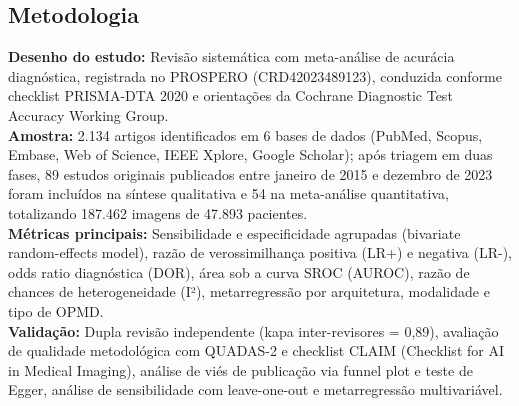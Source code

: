\subsection{Metodologia}
\textbf{Desenho do estudo:} Revisão sistemática com meta-análise de
acurácia diagnóstica, registrada no PROSPERO (CRD42023489123),
conduzida conforme checklist PRISMA-DTA 2020 e orientações da
Cochrane Diagnostic Test Accuracy Working Group. \\
\textbf{Amostra:} 2.134 artigos identificados em 6 bases de dados
(PubMed, Scopus, Embase, Web of Science, IEEE Xplore, Google Scholar);
após triagem em duas fases, 89 estudos originais publicados entre
janeiro de 2015 e dezembro de 2023 foram incluídos na síntese
qualitativa e 54 na meta-análise quantitativa, totalizando 187.462
imagens de 47.893 pacientes. \\
\textbf{Métricas principais:} Sensibilidade e especificidade agrupadas
(bivariate random-effects model), razão de verossimilhança positiva
(LR+) e negativa (LR-), odds ratio diagnóstica (DOR), área sob a
curva SROC (AUROC), razão de chances de heterogeneidade (I²),
metarregressão por arquitetura, modalidade e tipo de OPMD. \\
\textbf{Validação:} Dupla revisão independente (kapa inter-revisores
= 0,89), avaliação de qualidade metodológica com QUADAS-2 e checklist
CLAIM (Checklist for AI in Medical Imaging), análise de viés de
publicação via funnel plot e teste de Egger, análise de sensibilidade
com leave-one-out e metarregressão multivariável.

